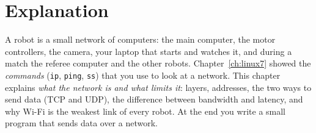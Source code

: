 \label{ch:hw2}

\section*{Explanation}
A robot is a small network of computers: the main computer, the motor controllers, the camera, your laptop that starts and watches it, and during a match the referee computer and the other robots. Chapter~\ref{ch:linux7} showed the \emph{commands} (\texttt{ip}, \texttt{ping}, \texttt{ss}) that you use to look at a network. This chapter explains \emph{what the network is and what limits it}: layers, addresses, the two ways to send data (TCP and UDP), the difference between bandwidth and latency, and why Wi-Fi is the weakest link of every robot. At the end you write a small program that sends data over a network.

